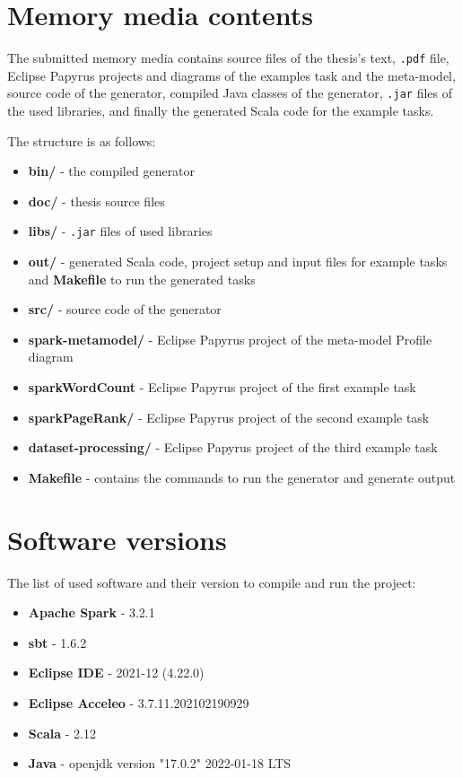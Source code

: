 
\chapter{Memory media contents}

The submitted memory media contains source files of the thesis's text, \texttt{.pdf} file, Eclipse Papyrus projects and diagrams of the examples task and the meta-model, source code of the generator, compiled Java classes of the generator, \texttt{.jar} files of the used libraries, and finally the generated Scala code for the example tasks.

The structure is as follows:

\begin{itemize}
    \item \textbf{bin/} - the compiled generator
    \item \textbf{doc/} - thesis source files
    \item \textbf{libs/} - \texttt{.jar} files of used libraries
    \item \textbf{out/} - generated Scala code, project setup and input files for example tasks and \textbf{Makefile} to run the generated tasks
    \item \textbf{src/} - source code of the generator
    \item \textbf{spark-metamodel/} - Eclipse Papyrus project of the meta-model Profile diagram
    \item \textbf{sparkWordCount} - Eclipse Papyrus project of the first example task
    \item \textbf{sparkPageRank/} - Eclipse Papyrus project of the second example task
    \item \textbf{dataset-processing/} - Eclipse Papyrus project of the third example task
    \item \textbf{Makefile} - contains the commands to run the generator and generate output 
\end{itemize}

\chapter{Software versions}

The list of used software and their version to compile and run the project:

\begin{itemize}
    \item \textbf{Apache Spark} - 3.2.1
    \item \textbf{sbt} - 1.6.2
    \item \textbf{Eclipse IDE} - 2021-12 (4.22.0)
    \item \textbf{Eclipse Acceleo} - 3.7.11.202102190929
    \item \textbf{Scala} - 2.12
    \item \textbf{Java} - openjdk version "17.0.2" 2022-01-18 LTS
\end{itemize}